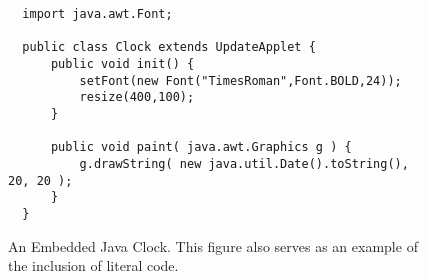 \documentclass{bsu-ms}
\begin{document}
%
%
%
% 

\begin{figure}
\begin{vcode}  %
\begin{verbatim}
  import java.awt.Font;

  public class Clock extends UpdateApplet {
      public void init() {
          setFont(new Font("TimesRoman",Font.BOLD,24));
          resize(400,100);
      }

      public void paint( java.awt.Graphics g ) {
          g.drawString( new java.util.Date().toString(), 20, 20 );
      }
  }
\end{verbatim}
\end{vcode}
\caption[An Embedded Java Clock]{An Embedded Java Clock.  This figure
also serves as an example of the inclusion of literal code.}
%
\label{fig:code} 
\end{figure}
\end{document}

